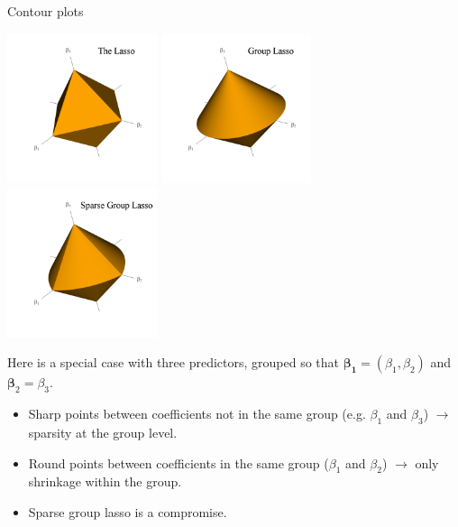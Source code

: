 \documentclass[8pt]{beamer}
\begin{document}
\begin{frame}{Contour plots}

\begin{center}
    \includegraphics[width = 0.33\textwidth]{3D_cont_lasso.pdf}
    \includegraphics[width = 0.33\textwidth]{3D_cont_glasso.pdf}
    \includegraphics[width = 0.33\textwidth]{3D_cont_sglasso.pdf}
\end{center}

Here is a special case with three predictors, grouped so that $\bm{\beta_1} = (\beta_1, \beta_2)$ and $\bm{\beta}_2 = \beta_3$.
\begin{itemize}
    \item Sharp points between coefficients not in the same group (e.g. $\beta_1$ and $\beta_3$) $\to$ sparsity at the group level.
    \item Round points between coefficients in the same group ($\beta_1$ and $\beta_2$) $\to$ only shrinkage within the group.
    \item Sparse group lasso is a compromise.
\end{itemize}
    
\end{frame}
\end{document}
